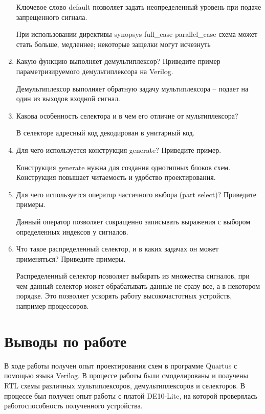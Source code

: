 \documentclass[a4paper,14pt]{article}
\begin{document}
\begin{enumerate}
	Ключевое слово default позволяет задать неопределенный уровень при подаче запрещенного сигнала.
	
	При использовании директивы synopsys full\_case parallel\_case схема может стать больше, медленнее;
	некоторые защелки могут исчезнуть
	
	\item Какую функцию выполняет демультиплексор? Приведите пример параметризируемого демультиплексора на Verilog.
	
	Демультиплексор выполняет обратную задачу мультиплексора -- подает на один из выходов входной сигнал.
	
	
	\item Какова особенность селектора и в чем его отличие от мультиплексора?
	
	В селекторе адресный код декодирован в унитарный код.
	
	\item Для чего используется конструкция generate? Приведите пример.
	
	Конструкция generate нужна для создания однотипных блоков схем.
	Конструкция повышает читаемость и удобство проектирования.
	
	\item Для чего используется оператор частичного выбора (part select)? Приведите примеры.
	
	Данный оператор позволяет сокращенно записывать выражения с выбором определенных индексов у сигналов.
	
	\item Что такое распределенный селектор, и в каких задачах он может применяться? Приведите примеры.
	
	Распределенный селектор позволяет выбирать из множества сигналов, при чем данный селектор может обрабатывать данные не сразу все, а в некотором порядке.
	Это позволяет ускорять работу высокочастотных устройств, например процессоров.
	
\end{enumerate}

\section{Выводы по работе}

В ходе работы получен опыт проектирования схем в программе Quartus с помощью языка Verilog.
В процессе работы были смоделированы и получены RTL схемы  различных мультиплексоров, демультиплексоров и селекторов.
В процессе был получен опыт работы с платой DE10-Lite, на которой проверялась работоспособность полученного устройства.
\end{document}
